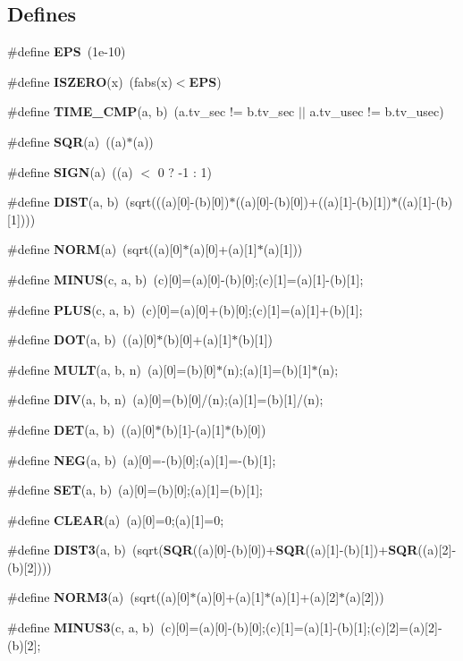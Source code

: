 \subsection*{\-Defines}
\begin{DoxyCompactItemize}
\item 
\#define {\bf \-E\-P\-S}~(1e-\/10)
\item 
\#define {\bf \-I\-S\-Z\-E\-R\-O}(x)~(fabs(x)$<${\bf \-E\-P\-S})
\item 
\#define {\bf \-T\-I\-M\-E\-\_\-\-C\-M\-P}(a, b)~(a.\-tv\-\_\-sec != b.\-tv\-\_\-sec $|$$|$ a.\-tv\-\_\-usec != b.\-tv\-\_\-usec)
\item 
\#define {\bf \-S\-Q\-R}(a)~((a)$\ast$(a))
\item 
\#define {\bf \-S\-I\-G\-N}(a)~((a) $<$ 0 ? -\/1 \-: 1)
\item 
\#define {\bf \-D\-I\-S\-T}(a, b)~(sqrt(((a)[0]-\/(b)[0])$\ast$((a)[0]-\/(b)[0])+((a)[1]-\/(b)[1])$\ast$((a)[1]-\/(b)[1])))
\item 
\#define {\bf \-N\-O\-R\-M}(a)~(sqrt((a)[0]$\ast$(a)[0]+(a)[1]$\ast$(a)[1]))
\item 
\#define {\bf \-M\-I\-N\-U\-S}(c, a, b)~(c)[0]=(a)[0]-\/(b)[0];(c)[1]=(a)[1]-\/(b)[1];
\item 
\#define {\bf \-P\-L\-U\-S}(c, a, b)~(c)[0]=(a)[0]+(b)[0];(c)[1]=(a)[1]+(b)[1];
\item 
\#define {\bf \-D\-O\-T}(a, b)~((a)[0]$\ast$(b)[0]+(a)[1]$\ast$(b)[1])
\item 
\#define {\bf \-M\-U\-L\-T}(a, b, n)~(a)[0]=(b)[0]$\ast$(n);(a)[1]=(b)[1]$\ast$(n);
\item 
\#define {\bf \-D\-I\-V}(a, b, n)~(a)[0]=(b)[0]/(n);(a)[1]=(b)[1]/(n);
\item 
\#define {\bf \-D\-E\-T}(a, b)~((a)[0]$\ast$(b)[1]-\/(a)[1]$\ast$(b)[0])
\item 
\#define {\bf \-N\-E\-G}(a, b)~(a)[0]=-\/(b)[0];(a)[1]=-\/(b)[1];
\item 
\#define {\bf \-S\-E\-T}(a, b)~(a)[0]=(b)[0];(a)[1]=(b)[1];
\item 
\#define {\bf \-C\-L\-E\-A\-R}(a)~(a)[0]=0;(a)[1]=0;
\item 
\#define {\bf \-D\-I\-S\-T3}(a, b)~(sqrt({\bf \-S\-Q\-R}((a)[0]-\/(b)[0])+{\bf \-S\-Q\-R}((a)[1]-\/(b)[1])+{\bf \-S\-Q\-R}((a)[2]-\/(b)[2])))
\item 
\#define {\bf \-N\-O\-R\-M3}(a)~(sqrt((a)[0]$\ast$(a)[0]+(a)[1]$\ast$(a)[1]+(a)[2]$\ast$(a)[2]))
\item 
\#define {\bf \-M\-I\-N\-U\-S3}(c, a, b)~(c)[0]=(a)[0]-\/(b)[0];(c)[1]=(a)[1]-\/(b)[1];(c)[2]=(a)[2]-\/(b)[2];
$$
\end{DoxyCompactItemize}
